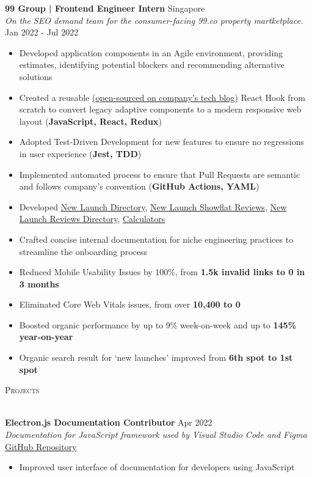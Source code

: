 \documentclass[a4paper]{article}
\newcommand{\lineunder} {
    \vspace*{-8pt} \\
    \hspace*{-12pt} \hrulefill \\
}
\newcommand{\header} [1] {
    {\hspace*{-12pt}\vspace*{6pt} \large\textsc{#1}}
    \vspace*{-6pt} \lineunder
}
\begin{document}
\textbf{99 Group | Frontend Engineer Intern} \hfill Singapore\\
\textit{On the SEO demand team for the consumer-facing 99.co property martketplace.} \hfill Jan 2022 - Jul 2022\\
\vspace{-2mm}
\begin{itemize} \itemsep 1pt
    \item Developed application components in an Agile environment, providing estimates, identifying potential blockers and recommending alternative solutions
	\item Created a reusable \href{https://medium.com/99dotco/adaptive-to-responsive-in-1-react-hook-4d1ce93e1488}{(open-sourced on company's tech blog)} React Hook from scratch to convert legacy adaptive components to a modern responsive web layout (\textbf{JavaScript, React, Redux})
	\item Adopted Test-Driven Development for new features to ensure no regressions in user experience (\textbf{Jest, TDD})
	\item Implemented automated process to ensure that Pull Requests are semantic and follows company’s convention (\textbf{GitHub Actions, YAML})
	\item Developed \href{https://www.99.co/singapore/new-launches}{New Launch Directory}, \href{https://www.99.co/singapore/condos-apartments/reviews/liv-mb}{New Launch Showflat Reviews}, \href{https://www.99.co/singapore/condos-apartments/reviews}{New Launch Reviews Directory}, \href{https://www.99.co/singapore/tools/tdsr-calculator}{Calculators}
	\item Crafted concise internal documentation for niche engineering practices to streamline the onboarding process
	\item Reduced Mobile Usability Issues by 100\%, from \textbf{1.5k invalid links to 0 in 3 months}
	\item Eliminated Core Web Vitals issues, from over \textbf{10,400 to 0}
	\item Boosted organic performance by up to 9\% week-on-week and up to \textbf{145\% year-on-year}
	\item Organic search result for ‘new launches’ improved from \textbf{6th spot to 1st spot}
\end{itemize}

\header{Projects}
\vspace{1mm}

\textbf{Electron.js Documentation Contributor} \hfill Apr 2022\\
\textit{Documentation for JavaScript framework used by Visual Studio Code and Figma} \hfill \href{https://github.com/electron/electronjs.org-new/pull/211}{GitHub Repository}\\
\vspace{-2mm}
\begin{itemize} \itemsep 1pt
    \item Improved user interface of documentation for developers using JavaScript
\end{itemize}
\end{document}
